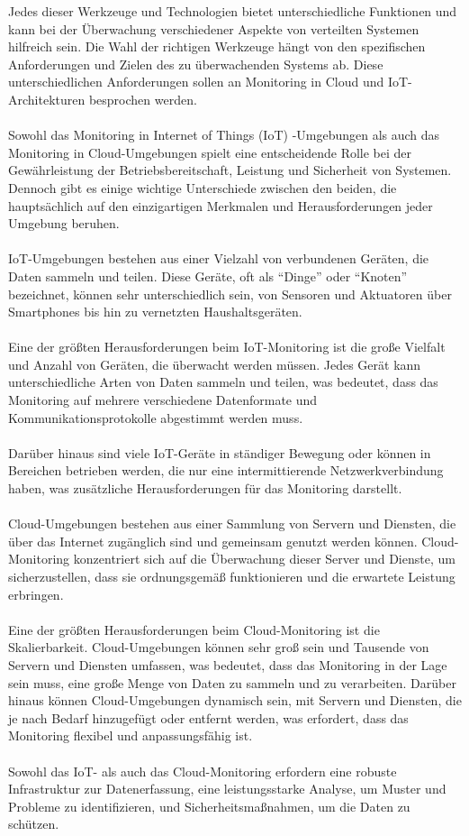 \documentclass[../vs-script-first-v01.tex]{subfiles}
\begin{document}
Jedes dieser Werkzeuge und Technologien bietet unterschiedliche Funktionen und kann bei der Überwachung verschiedener Aspekte von verteilten Systemen hilfreich sein. Die Wahl der richtigen Werkzeuge hängt von den spezifischen Anforderungen und Zielen des zu überwachenden Systems ab. Diese unterschiedlichen Anforderungen sollen an Monitoring in Cloud und IoT-Architekturen besprochen werden. 
\\\\
Sowohl das Monitoring in Internet of Things (IoT) -Umgebungen als auch das Monitoring in Cloud-Umgebungen spielt eine entscheidende Rolle bei der Gewährleistung der Betriebsbereitschaft, Leistung und Sicherheit von Systemen. Dennoch gibt es einige wichtige Unterschiede zwischen den beiden, die hauptsächlich auf den einzigartigen Merkmalen und Herausforderungen jeder Umgebung beruhen.
\\\\
IoT-Umgebungen bestehen aus einer Vielzahl von verbundenen Geräten, die Daten sammeln und teilen. Diese Geräte, oft als \enquote{Dinge} oder \enquote{Knoten} bezeichnet, können sehr unterschiedlich sein, von Sensoren und Aktuatoren über Smartphones bis hin zu vernetzten Haushaltsgeräten.
\\\\
Eine der größten Herausforderungen beim IoT-Monitoring ist die große Vielfalt und Anzahl von Geräten, die überwacht werden müssen. Jedes Gerät kann unterschiedliche Arten von Daten sammeln und teilen, was bedeutet, dass das Monitoring auf mehrere verschiedene Datenformate und Kommunikationsprotokolle abgestimmt werden muss.
\\\\
Darüber hinaus sind viele IoT-Geräte in ständiger Bewegung oder können in Bereichen betrieben werden, die nur eine intermittierende Netzwerkverbindung haben, was zusätzliche Herausforderungen für das Monitoring darstellt.
\\\\
Cloud-Umgebungen bestehen aus einer Sammlung von Servern und Diensten, die über das Internet zugänglich sind und gemeinsam genutzt werden können. Cloud-Monitoring konzentriert sich auf die Überwachung dieser Server und Dienste, um sicherzustellen, dass sie ordnungsgemäß funktionieren und die erwartete Leistung erbringen.
\\\\
Eine der größten Herausforderungen beim Cloud-Monitoring ist die Skalierbarkeit. Cloud-Umgebungen können sehr groß sein und Tausende von Servern und Diensten umfassen, was bedeutet, dass das Monitoring in der Lage sein muss, eine große Menge von Daten zu sammeln und zu verarbeiten. Darüber hinaus können Cloud-Umgebungen dynamisch sein, mit Servern und Diensten, die je nach Bedarf hinzugefügt oder entfernt werden, was erfordert, dass das Monitoring flexibel und anpassungsfähig ist.
\\\\
Sowohl das IoT- als auch das Cloud-Monitoring erfordern eine robuste Infrastruktur zur Datenerfassung, eine leistungsstarke Analyse, um Muster und Probleme zu identifizieren, und Sicherheitsmaßnahmen, um die Daten zu schützen. 
\end{document}
